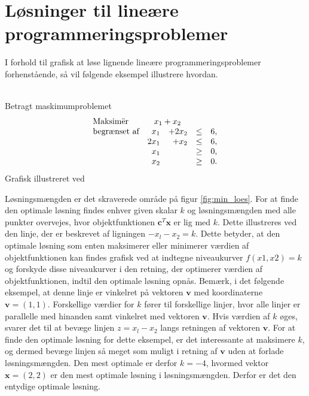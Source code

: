 \section{Løsninger til lineære programmeringsproblemer}
\label{heeeeejjulle}
I forhold til grafisk at løse lignende lineære programmeringsproblemer forhenstående, så vil følgende eksempel illustrere hvordan. 
\\\\
\begin{eks}\label{eks:min_loes}
Betragt maskimumproblemet
%
\begin{align*}
\begin{array}{lrrlr}
\text{Maksimër}		&	\multicolumn{2}{c}{x_1+x_2}  &\\
\text{begrænset af}	&x_1& + 2x_2			&\leq 	& 6,\\
					&2x_1& + x_2			&\leq	& 6,\\
					&x_1&    				&\geq	& 0,\\
					&x_2&    				&\geq	& 0.\\
\end{array}
\end{align*}
%
Grafisk illustreret ved 
%

%
\noindent
Løsningsmængden er det skraverede område på figur \ref{fig:min_loes}. For at finde den optimale løsning findes enhver given skalar $k$ og løsningsmængden med alle punkter overvejes, hvor objektfunktionen $\textbf{c}^T\textbf{x}$ er lig med $k$. Dette illustreres ved den linje, der er beskrevet af ligningen $-x_l-x_2=k$. Dette betyder, at den optimale løsning som enten maksimerer eller minimerer værdien
af objektfunktionen kan findes grafisk ved at indtegne niveaukurver $f(x1, x2)=k$ og forskyde disse niveaukurver i den retning, der optimerer værdien af objektfunktionen, indtil den optimale løsning opnås.  Bemærk, i det følgende eksempel, at denne linje er vinkelret på vektoren $\textbf{v}$ med koordinaterne $\textbf{v}=(1,1)$.
Forskellige værdier for $k$ fører til forskellige linjer, hvor  alle linjer er parallelle med hinanden samt vinkelret med vektoren $\textbf{v}$. Hvis værdien af $k$ øges, svarer det til at bevæge linjen $z=x_l-x_2$ langs retningen af vektoren $\textbf{v}$. For at finde den optimale løsning for dette eksempel, er det interessante at maksimere $k$, og dermed bevæge linjen så meget som muligt i retning af $\textbf{v}$ uden at forlade løsningsmængden. Den mest optimale er derfor $k = -4$, hvormed vektor $\textbf{x}=(2,2)$ er den mest optimale løsning i løsningsmængden. Derfor er det den entydige optimale løsning. \\\\

\end{eks}
